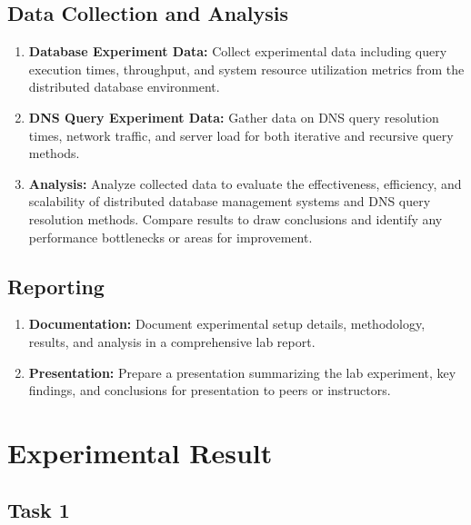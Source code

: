 \documentclass[11pt]{article}
\begin{document}
\subsection{Data Collection and Analysis}

\begin{enumerate}
\item \textbf{Database Experiment Data:} Collect experimental data including query execution times, throughput, and system resource utilization metrics from the distributed database environment.
\item \textbf{DNS Query Experiment Data:} Gather data on DNS query resolution times, network traffic, and server load for both iterative and recursive query methods.
\item \textbf{Analysis:} Analyze collected data to evaluate the effectiveness, efficiency, and scalability of distributed database management systems and DNS query resolution methods. Compare results to draw conclusions and identify any performance bottlenecks or areas for improvement.
\end{enumerate}

\subsection{Reporting}

\begin{enumerate}
\item \textbf{Documentation:} Document experimental setup details, methodology, results, and analysis in a comprehensive lab report.
\item \textbf{Presentation:} Prepare a presentation summarizing the lab experiment, key findings, and conclusions for presentation to peers or instructors.
\end{enumerate}





\section{Experimental Result}

\subsection{Task 1}
\end{document}
